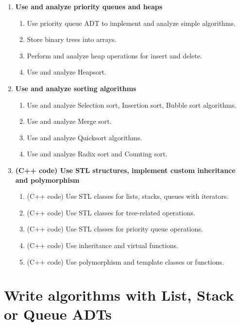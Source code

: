 \documentclass[a4paper,12pt]{article}
\begin{document}
{\begin{enumerate}
\begin{enumerate}[label=3.\Alph*.]
\item Use binary trees to encode another structure such as a multiway tree.
\item Build AVL trees, perform rotations, run insert and delete operations.
\end{enumerate}
\item \textbf{Use and analyze priority queues and heaps} 
\begin{enumerate}[label=4.\Alph*.]
\item Use priority queue ADT to implement and analyze simple algorithms.
\item Store binary trees into arrays.
\item Perform and analyze heap operations for insert and delete.
\item Use and analyze Heapsort.
\end{enumerate}
\item \textbf{Use and analyze sorting algorithms} 
\begin{enumerate}[label=5.\Alph*.]
\item Use and analyze Selection sort, Insertion sort, Bubble sort algorithms.
\item Use and analyze Merge sort. 
\item Use and analyze Quicksort algorithms.
\item Use and analyze Radix sort and Counting sort.
\end{enumerate}
\item \textbf{(C++ code) Use STL structures, implement custom inheritance and polymorphism} 
\begin{enumerate}[label=6.\Alph*.]
\item (C++ code) Use STL classes for lists, stacks, queues with iterators.
\item (C++ code) Use STL classes for tree-related operations. 
\item (C++ code) Use STL classes for priority queue operations.
\item (C++ code) Use inheritance and virtual functions. 
\item (C++ code) Use polymorphism and template classes or functions.
\end{enumerate}
\end{enumerate}
}


\clearpage

\section{Write algorithms with List, Stack or Queue ADTs}
\end{document}
